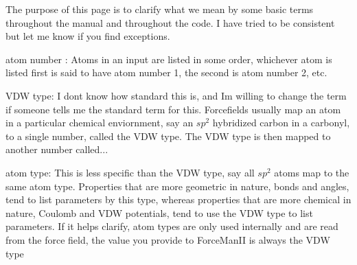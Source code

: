 The purpose of this page is to clarify what we mean by some basic terms throughout the manual and throughout the code. I have tried to be consistent but let me know if you find exceptions.


\begin{DoxyItemize}
\item atom number \+: Atoms in an input are listed in some order, whichever atom is listed first is said to have atom number 1, the second is atom number 2, etc.
\item V\+DW type\+: I don\textquotesingle{}t know how standard this is, and I\textquotesingle{}m willing to change the term if someone tells me the standard term for this. Forcefields usually map an atom in a particular chemical enviornment, say an $sp^2$ hybridized carbon in a carbonyl, to a single number, called the V\+DW type. The V\+DW type is then mapped to another number called...
\item atom type\+: This is less specific than the V\+DW type, say all $sp^2$ atoms map to the same atom type. Properties that are more geometric in nature, bonds and angles, tend to list parameters by this type, whereas properties that are more chemical in nature, Coulomb and V\+DW potentials, tend to use the V\+DW type to list parameters. If it helps clarify, atom types are only used internally and are read from the force field, the value you provide to Force\+Man\+II is always the V\+DW type 
\end{DoxyItemize}